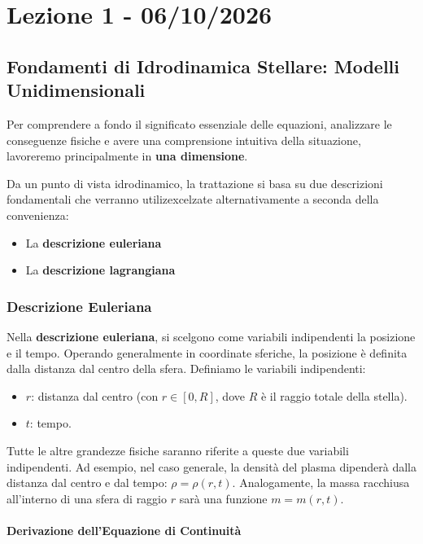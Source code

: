 \chapter{Lezione 1 - 06/10/2026}

\section{Fondamenti di Idrodinamica Stellare: Modelli Unidimensionali}

Per comprendere a fondo il significato essenziale delle equazioni, analizzare le conseguenze fisiche e avere una comprensione intuitiva della situazione, lavoreremo principalmente in \textbf{una dimensione}.

Da un punto di vista idrodinamico, la trattazione si basa su due descrizioni fondamentali che verranno utilizexcelzate alternativamente a seconda della convenienza:
\begin{itemize}
\item La \textbf{descrizione euleriana}
\item La \textbf{descrizione lagrangiana}
\end{itemize}


\subsection{Descrizione Euleriana}

Nella \textbf{descrizione euleriana}, si scelgono come variabili indipendenti la posizione e il tempo. Operando generalmente in coordinate sferiche, la posizione è definita dalla distanza dal centro della sfera. Definiamo le variabili indipendenti:
\begin{itemize}
\item $r$: distanza dal centro (con $r \in [0, R]$, dove $R$ è il raggio totale della stella).
\item $t$: tempo.
\end{itemize}

Tutte le altre grandezze fisiche saranno riferite a queste due variabili indipendenti. Ad esempio, nel caso generale, la densità del plasma dipenderà dalla distanza dal centro e dal tempo: $\rho = \rho(r,t)$. Analogamente, la massa racchiusa all'interno di una sfera di raggio $r$ sarà una funzione $m = m(r,t)$.

\subsubsection{Derivazione dell'Equazione di Continuità}

